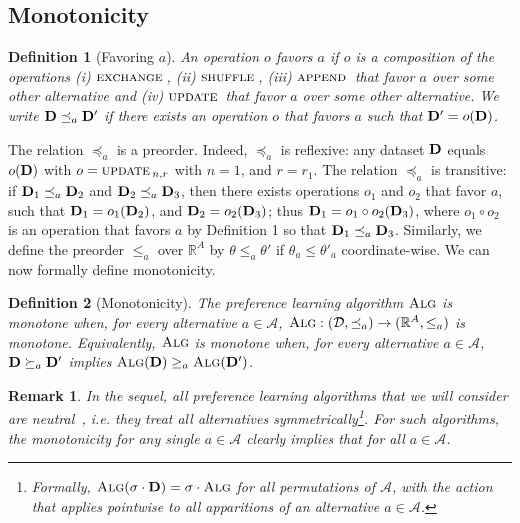 \documentclass{article}
\newcommand{\setR}{\mathbb R}
\DeclareMathOperator*{\append}{\textsc{append}}
\DeclareMathOperator*{\update}{\textsc{update}}
\DeclareMathOperator*{\shuffle}{\textsc{shuffle}}
\DeclareMathOperator*{\exchange}{\textsc{exchange}}
\newtheorem{definition}{Definition}
\newtheorem{remark}{Remark}
\newcommand{\ALG}{\textsc{Alg}}
\newcommand{\cA}{\mathcal A}
\newcommand{\cD}{\mathcal D}
\newcommand{\bD}{{\bf D}}
\begin{document}
\subsection{Monotonicity}

\begin{definition}[Favoring $a$]
An operation $o$ \emph{favors} $a$
if $o$ is a composition of the operations
(i) $\exchange{}$, (ii) $\shuffle{}$, 
(iii) $\append{}$ that  favor $a$ over some other alternative
and (iv) $\update{}$ that favor $a$ over some other alternative.
We write $\bD \preceq_a \bD'$
if there exists an operation $o$ that favors $a$
such that $\bD'= o(\bD)$.
\label{def:favor-a}
\end{definition}

The relation $\preceq_{a}$ is a preorder.
Indeed, $\preceq_{a}$ is reflexive: any dataset $\bD$ equals $o(\bD)$ with $o = \update{}_{n, r}$ with $n=1$, and $r=r_1$. The relation $\preceq_{a}$ is transitive: if $\bD_1 \preceq_a \bD_2$ and $\bD_2 \preceq_a \bD_3$, then there exists operations $o_1$ and $o_2$ that favor $a$, such that $\bD_1 = o_1(\bD_2)$, and $\bD_2=o_2(\bD_3)$; thus $\bD_1=o_1 \circ o_2(\bD_3)$, where $o_1\circ o_2$ is an operation that favors $a$ by Definition 1 so that $\bD_1 \preceq_a \bD_3$.
Similarly, we define the preorder $\leq_a$ over $\setR^A$ by $\theta \leq_a \theta'$ if $\theta_a \leq \theta'_a$ coordinate-wise.
We can now formally define monotonicity.

\begin{definition}[Monotonicity]\label{def:monotonicity}
    The preference learning algorithm $\ALG$ is \emph{monotone} when,
    for every alternative $a \in \cA$,
    $\ALG: (\cD, \preceq_a) \to (\mathbb{R}^A, \le_a)$
    is monotone.
    Equivalently, $\ALG$ is monotone when,
    for every alternative $a \in \cA$,
    $\bD \succeq_a \bD'$ implies $\ALG(\bD) \ge_a \ALG(\bD')$.
\end{definition}

\begin{remark}
    In the sequel, 
    all preference learning algorithms that we will consider 
    are \emph{neutral}~\cite{myerson2013fundamentals},
    i.e. they treat all alternatives symmetrically\footnote{
    Formally, $\ALG(\sigma \cdot \bD) = \sigma \cdot \ALG$
    for all permutations of $\cA$, with the action that applies pointwise
    to all apparitions of an alternative $a \in \cA$.
    }.
    For such algorithms, the monotonicity for any single $a \in \cA$ clearly implies that
    for all $a \in \cA$.
\end{remark}
\end{document}
